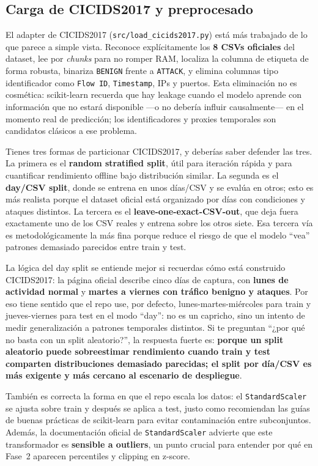 ﻿\documentclass[12pt,a4paper]{article}
\begin{document}
\subsection{Carga de CICIDS2017 y preprocesado}

El adapter de CICIDS2017 (\verb|src/load_cicids2017.py|) está más trabajado de lo que parece a
simple vista. Reconoce explícitamente los \textbf{8 CSVs oficiales} del dataset, lee por
\textit{chunks} para no romper RAM, localiza la columna de etiqueta de forma robusta, binariza
\texttt{BENIGN} frente a \texttt{ATTACK}, y elimina columnas tipo identificador como
\texttt{Flow~ID}, \texttt{Timestamp}, IPs y puertos. Esta eliminación no es cosmética: scikit-learn
recuerda que hay leakage cuando el modelo aprende con información que no estará disponible ---o no
debería influir causalmente--- en el momento real de predicción; los identificadores y proxies
temporales son candidatos clásicos a ese problema.

Tienes tres formas de particionar CICIDS2017, y deberías saber defender las tres. La primera es el
\textbf{random stratified split}, útil para iteración rápida y para cuantificar rendimiento offline
bajo distribución similar. La segunda es el \textbf{day/CSV split}, donde se entrena en unos
días/CSV y se evalúa en otros; esto es más realista porque el dataset oficial está organizado por
días con condiciones y ataques distintos. La tercera es el \textbf{leave-one-exact-CSV-out}, que
deja fuera exactamente uno de los CSV reales y entrena sobre los otros siete. Esa tercera vía es
metodológicamente la más fina porque reduce el riesgo de que el modelo ``vea'' patrones demasiado
parecidos entre train y test.

La lógica del day split se entiende mejor si recuerdas cómo está construido CICIDS2017: la página
oficial describe cinco días de captura, con \textbf{lunes de actividad normal} y \textbf{martes a
viernes con tráfico benigno y ataques}. Por eso tiene sentido que el repo use, por defecto,
lunes-martes-miércoles para train y jueves-viernes para test en el modo ``day'': no es un capricho,
sino un intento de medir generalización a patrones temporales distintos. Si te preguntan ``¿por qué
no basta con un split aleatorio?'', la respuesta fuerte es: \textbf{porque un split aleatorio puede
sobreestimar rendimiento cuando train y test comparten distribuciones demasiado parecidas; el split
por día/CSV es más exigente y más cercano al escenario de despliegue}.

También es correcta la forma en que el repo escala los datos: el \texttt{StandardScaler} se ajusta
sobre train y después se aplica a test, justo como recomiendan las guías de buenas prácticas de
scikit-learn para evitar contaminación entre subconjuntos. Además, la documentación oficial de
\texttt{StandardScaler} advierte que este transformador es \textbf{sensible a outliers}, un punto
crucial para entender por qué en Fase~2 aparecen percentiles y clipping en z-score.
\end{document}
